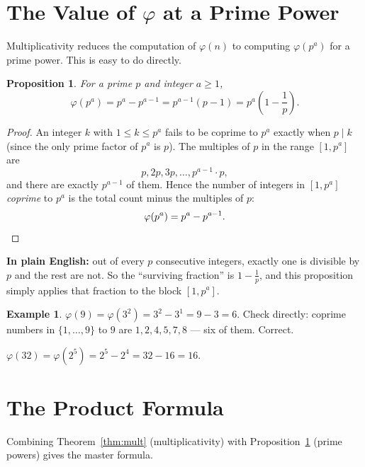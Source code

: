 \documentclass[11pt]{article}
\newtheorem{proposition}[theorem]{Proposition}
\theoremstyle{definition}
\newtheorem{example}[theorem]{Example}
\theoremstyle{remark}
\begin{document}
\section{The Value of $\varphi$ at a Prime Power}

Multiplicativity reduces the computation of $\varphi(n)$ to computing $\varphi(p^a)$ for a prime power. This is easy to do directly.

\begin{proposition}\label{prop:primepower}
For a prime $p$ and integer $a \ge 1$,
\[
\varphi(p^a) = p^a - p^{a-1} = p^{a-1}(p-1) = p^a\left(1 - \frac{1}{p}\right).
\]
\end{proposition}

\begin{proof}
An integer $k$ with $1 \le k \le p^a$ fails to be coprime to $p^a$ exactly when $p \mid k$ (since the only prime factor of $p^a$ is $p$). The multiples of $p$ in the range $[1, p^a]$ are
\[
p, 2p, 3p, \dots, p^{a-1}\cdot p,
\]
and there are exactly $p^{a-1}$ of them. Hence the number of integers in $[1,p^a]$ \emph{coprime} to $p^a$ is the total count minus the multiples of $p$:
\[
\varphi(p^a) = p^a - p^{a-1}. \qedhere
\]
\end{proof}

\noindent\textbf{In plain English:} out of every $p$ consecutive integers, exactly one is divisible by $p$ and the rest are not. So the ``surviving fraction'' is $1 - \tfrac1p$, and this proposition simply applies that fraction to the block $[1,p^a]$.

\begin{example}
$\varphi(9) = \varphi(3^2) = 3^2 - 3^1 = 9 - 3 = 6$. Check directly: coprime numbers in $\{1,\dots,9\}$ to $9$ are $1,2,4,5,7,8$ — six of them. Correct.

$\varphi(32) = \varphi(2^5) = 2^5 - 2^4 = 32 - 16 = 16.$
\end{example}

\section{The Product Formula}

Combining Theorem~\ref{thm:mult} (multiplicativity) with Proposition~\ref{prop:primepower} (prime powers) gives the master formula.
\end{document}
